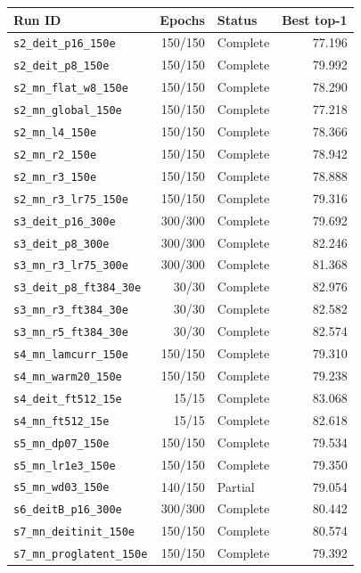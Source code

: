 \begin{tabular}{lrlr}
\toprule
Run ID & Epochs & Status & Best top-1 \\
\midrule
\texttt{s2\_deit\_p16\_150e} & 150/150 & Complete & 77.196 \\
\texttt{s2\_deit\_p8\_150e} & 150/150 & Complete & 79.992 \\
\texttt{s2\_mn\_flat\_w8\_150e} & 150/150 & Complete & 78.290 \\
\texttt{s2\_mn\_global\_150e} & 150/150 & Complete & 77.218 \\
\texttt{s2\_mn\_l4\_150e} & 150/150 & Complete & 78.366 \\
\texttt{s2\_mn\_r2\_150e} & 150/150 & Complete & 78.942 \\
\texttt{s2\_mn\_r3\_150e} & 150/150 & Complete & 78.888 \\
\texttt{s2\_mn\_r3\_lr75\_150e} & 150/150 & Complete & 79.316 \\
\texttt{s3\_deit\_p16\_300e} & 300/300 & Complete & 79.692 \\
\texttt{s3\_deit\_p8\_300e} & 300/300 & Complete & 82.246 \\
\texttt{s3\_mn\_r3\_lr75\_300e} & 300/300 & Complete & 81.368 \\
\texttt{s3\_deit\_p8\_ft384\_30e} & 30/30 & Complete & 82.976 \\
\texttt{s3\_mn\_r3\_ft384\_30e} & 30/30 & Complete & 82.582 \\
\texttt{s3\_mn\_r5\_ft384\_30e} & 30/30 & Complete & 82.574 \\
\texttt{s4\_mn\_lamcurr\_150e} & 150/150 & Complete & 79.310 \\
\texttt{s4\_mn\_warm20\_150e} & 150/150 & Complete & 79.238 \\
\texttt{s4\_deit\_ft512\_15e} & 15/15 & Complete & 83.068 \\
\texttt{s4\_mn\_ft512\_15e} & 15/15 & Complete & 82.618 \\
\texttt{s5\_mn\_dp07\_150e} & 150/150 & Complete & 79.534 \\
\texttt{s5\_mn\_lr1e3\_150e} & 150/150 & Complete & 79.350 \\
\texttt{s5\_mn\_wd03\_150e} & 140/150 & Partial & 79.054 \\
\texttt{s6\_deitB\_p16\_300e} & 300/300 & Complete & 80.442 \\
\texttt{s7\_mn\_deitinit\_150e} & 150/150 & Complete & 80.574 \\
\texttt{s7\_mn\_proglatent\_150e} & 150/150 & Complete & 79.392 \\
\bottomrule
\end{tabular}
